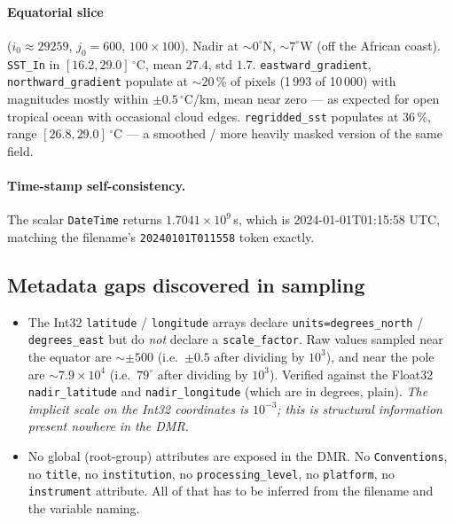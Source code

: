 \documentclass[11pt]{article}
\begin{document}
\paragraph{Equatorial slice} ($i_0 \approx 29259$, $j_0=600$,
$100\times 100$). Nadir at $\sim 0^\circ$N, $\sim 7^\circ$W (off the
African coast). \texttt{SST\_In} in $[16.2, 29.0]\,^\circ$C, mean
$27.4$, std $1.7$. \texttt{eastward\_gradient},
\texttt{northward\_gradient} populate at $\sim$20\,\% of pixels
(1\,993 of 10\,000) with magnitudes mostly within $\pm
0.5\,^\circ$C/km, mean near zero --- as expected for open tropical
ocean with occasional cloud edges. \texttt{regridded\_sst} populates
at 36\,\%, range $[26.8, 29.0]\,^\circ$C --- a smoothed / more
heavily masked version of the same field.

\paragraph{Time-stamp self-consistency.} The scalar
\texttt{DateTime} returns $1.7041 \times 10^9$\,s, which is
2024-01-01T01:15:58 UTC, matching the filename's
\texttt{20240101T011558} token exactly.

\subsection{Metadata gaps discovered in sampling}\label{sec:gaps}

\begin{itemize}
  \item The Int32 \texttt{latitude} / \texttt{longitude} arrays
    declare \texttt{units=degrees\_north} / \texttt{degrees\_east}
    but do \emph{not} declare a \texttt{scale\_factor}. Raw values
    sampled near the equator are $\sim\pm 500$ (i.e.\ $\pm 0.5$
    after dividing by $10^3$), and near the pole are
    $\sim 7.9 \times 10^4$ (i.e.\ $79^\circ$ after dividing by
    $10^3$). Verified against the Float32 \texttt{nadir\_latitude}
    and \texttt{nadir\_longitude} (which are in degrees, plain).
    \emph{The implicit scale on the Int32 coordinates is $10^{-3}$;
    this is structural information present nowhere in the DMR.}
  \item No global (root-group) attributes are exposed in the DMR.
    No \texttt{Conventions}, no \texttt{title}, no
    \texttt{institution}, no \texttt{processing\_level}, no
    \texttt{platform}, no \texttt{instrument} attribute. All of
    that has to be inferred from the filename and the variable
    naming.
\end{itemize}
\end{document}
